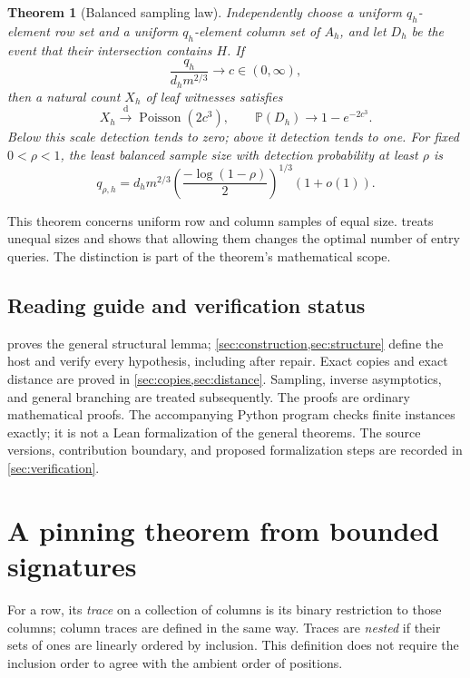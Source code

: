\documentclass[11pt]{article}
\newtheorem{theorem}{Theorem}[section]
\theoremstyle{definition}
\newcommand{\Prob}{\mathbb P}
\newcommand{\Poi}{\operatorname{Poisson}}
\newcommand{\dd}{\mathrm d}
\begin{document}
\begin{theorem}[Balanced sampling law]
\label{thm:main-sampling}
Independently choose a uniform \(q_h\)-element row set and a uniform
\(q_h\)-element column set of \(A_h\), and let \(D_h\) be the event that
their intersection contains \(H\). If
\[
 \frac{q_h}{d_hm^{2/3}}\longrightarrow c\in(0,\infty),
\]
then a natural count \(X_h\) of leaf witnesses satisfies
\begin{equation}
 X_h\xrightarrow{\dd}\Poi(2c^3),\qquad
 \Prob(D_h)\longrightarrow1-e^{-2c^3}.
 \label{eq:main-poisson}
\end{equation}
Below this scale detection tends to zero; above it detection tends to one.
For fixed \(0<\rho<1\), the least balanced sample size with detection
probability at least \(\rho\) is
\begin{equation}
 q_{\rho,h}=d_hm^{2/3}
 \left(\frac{-\log(1-\rho)}{2}\right)^{1/3}(1+o(1)).
 \label{eq:quantile}
\end{equation}
\end{theorem}

This theorem concerns uniform row and column samples of equal size.
 treats unequal sizes and shows that allowing them
changes the optimal number of entry queries. The distinction is part of
the theorem's mathematical scope.

\subsection{Reading guide and verification status}

 proves the general structural lemma;
\cref{sec:construction,sec:structure} define the host and verify every
hypothesis, including after repair. Exact copies and exact distance are
proved in \cref{sec:copies,sec:distance}. Sampling, inverse asymptotics,
and general branching are treated subsequently. The proofs are ordinary
mathematical proofs. The accompanying Python program checks finite
instances exactly; it is not a Lean formalization of the general theorems.
The source versions, contribution boundary, and proposed formalization
steps are recorded in \cref{sec:verification}.

\section{A pinning theorem from bounded signatures}
\label{sec:pinning}

For a row, its \emph{trace} on a collection of columns is its binary
restriction to those columns; column traces are defined in the same way.
Traces are \emph{nested} if their sets of ones are linearly ordered by
inclusion. This definition does not require the inclusion order to agree
with the ambient order of positions.
\end{document}

